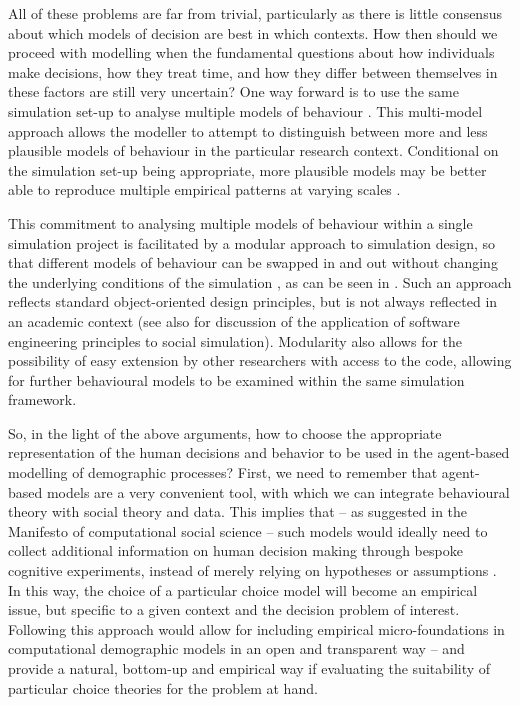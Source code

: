 \documentclass{article}
\begin{document}
All of these problems are far from trivial, particularly as there is little consensus about which models of decision are best in which contexts. How then should we proceed with modelling when the fundamental questions about how individuals make decisions, how they treat time, and how they differ between themselves in these factors are still very uncertain? One way forward is to use the same simulation set-up to analyse multiple models of behaviour \citep{Epstein2013, Rossiter2014}. This multi-model approach allows the modeller to attempt to distinguish between more and less plausible models of behaviour in the particular research context. Conditional on the simulation set-up being appropriate, more plausible models may be better able to reproduce multiple empirical patterns at varying scales \citep{Werker2004, Bianchi2008}.

This commitment to analysing multiple models of behaviour within a single simulation project is facilitated by a modular approach to simulation design, so that different models of behaviour can be swapped in and out without changing the underlying conditions of the simulation \citep{Epstein2013}, as can be seen in \citet{Gray2016}. Such an approach reflects standard object-oriented design principles, but is not always reflected in an academic context (see also \citet{Rossiter2015} for discussion of the application of software engineering principles to social simulation). Modularity also allows for the possibility of easy extension by other researchers with access to the code, allowing for further behavioural models to be examined within the same simulation framework.

So, in the light of the above arguments, how to choose the appropriate representation of the human decisions and behavior to be used in the agent-based modelling of demographic processes? First, we need to remember that agent-based models are a very convenient tool, with which we can integrate behavioural theory with social theory and data. This implies that – as suggested in the Manifesto of computational social science \citep{Conte} – such models would ideally need to collect additional information on human decision making through bespoke cognitive experiments, instead of merely relying on hypotheses or assumptions \citep{Courgeau}. In this way, the choice of a particular choice model will become an empirical issue, but specific to a given context and the decision problem of interest. Following this approach would allow for including empirical micro-foundations in computational demographic models in an open and transparent way – and provide a natural, bottom-up and empirical way if evaluating the suitability of particular choice theories for the problem at hand.
\end{document}
